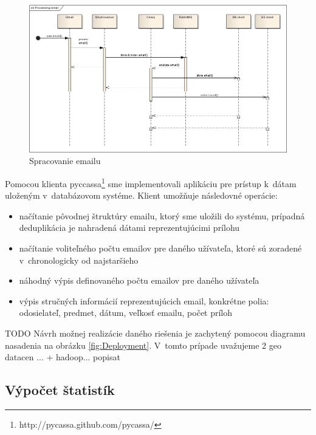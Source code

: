 \documentclass[11pt,twoside,a4paper]{book}
\begin{document}
\begin{figure}[h]
 \centering
 \includegraphics[width=16cm]{./figures/emailProcessing.png}
 \caption{Spracovanie emailu}
 \label{fig:Cseq}
\end{figure}

Pomocou klienta pyccassa\footnote{http://pycassa.github.com/pycassa/} sme implementovali aplikáciu pre prístup k~dátam uloženým v~databázovom systéme. Klient umožňuje následovné operácie:
\begin{itemize}
 \item načítanie pôvodnej štruktúry emailu, ktorý sme uložili do systému, prípadná deduplikácia je nahradená dátami reprezentujúcimi prílohu
 \item načítanie voliteľného počtu emailov pre daného užívateľa, ktoré sú zoradené v~chronologicky od najstaršieho
 \item náhodný výpis definovaného počtu emailov pre daného užívateľa
 \item výpis stručných informácií reprezentujúcich email, konkrétne polia: odosielateľ, predmet, dátum, veľkosť emailu, počet príloh
\end{itemize}


TODO
Návrh možnej realizácie daného riešenia je zachytený pomocou diagramu nasadenia na obrázku \ref{fig:Deployment}. V~tomto prípade uvažujeme 2 geo datacen ... + hadoop... popisat


\subsection{Výpočet štatistík}
\end{document}
